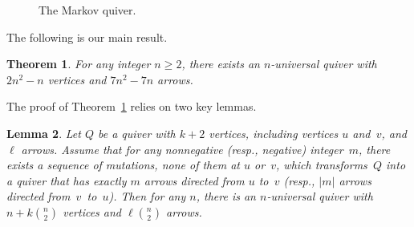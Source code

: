 \documentclass[10pt]{amsart}
\newtheorem{theorem}{Theorem}[section]
\newtheorem{lemma}[theorem]{Lemma}
\theoremstyle{definition}
\begin{document}
\begin{figure}[ht]\centering
{}

\caption{The Markov quiver. }
\label{fig:Markov-quiver}
\end{figure}

The following is our main result. 

\begin{theorem}
\label{thm:main-thm-quivers}
For any integer $n\ge 2$, there exists an $n$-universal quiver with $2n^2-n$ vertices and $7n^2-7n$ arrows. 
\end{theorem}

The proof of Theorem~\ref{thm:main-thm-quivers} relies on two key lemmas.

\begin{lemma}
\label{lem:gluing}
Let $Q$ be a quiver with $k+2$ vertices, including vertices $u$ and~$v$, and $\ell$ arrows. Assume that for any nonnegative (resp., negative) integer~$m$, there exists a sequence of mutations, none of them at $u$ or~$v$, which transforms~$Q$ into a quiver that has exactly $m$ arrows directed from $u$ to~$v$ (resp., $|m|$ arrows directed from~$v$~to~$u$). %
Then for any $n$, there is an $n$-universal quiver with $n+k\binom{n}{2}$ vertices and $\ell\binom{n}{2}$ arrows. 
\end{lemma}
\end{document}
